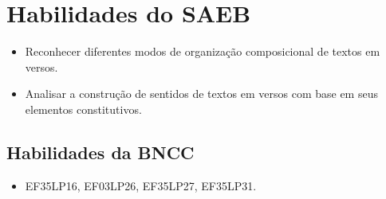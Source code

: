 \section{Habilidades do SAEB}

\begin{itemize}
  \item Reconhecer diferentes modos de organização composicional de
textos em versos.
  \item Analisar a construção de sentidos de textos em versos com base
em seus elementos constitutivos.
\end{itemize}

\subsection{Habilidades da BNCC}

\begin{itemize}
\item EF35LP16, EF03LP26, EF35LP27, EF35LP31.
\end{itemize}

